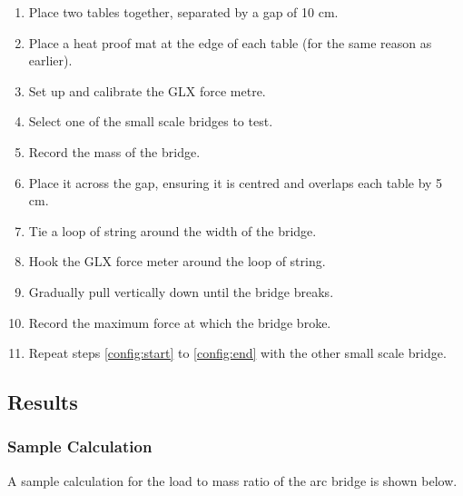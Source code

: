 \documentclass[a4paper,11pt]{article}
\begin{document}
\begin{enumerate}
\item Place two tables together, separated by a gap of 10 cm.
\item Place a heat proof mat at the edge of each table (for the same reason as
	earlier).
\item Set up and calibrate the GLX force metre.
\item \label{config:start} Select one of the small scale bridges to test.
\item Record the mass of the bridge.
\item Place it across the gap, ensuring it is centred and overlaps each table
	by 5 cm.
\item Tie a loop of string around the width of the bridge.
\item Hook the GLX force meter around the loop of string.
\item Gradually pull vertically down until the bridge breaks.
\item \label{config:end} Record the maximum force at which the bridge broke.
\item Repeat steps \ref{config:start} to \ref{config:end} with the other small
	scale bridge.
\end{enumerate}


\subsection{Results}

\begin{center}
\end{center}


\subsubsection{Sample Calculation}

A sample calculation for the load to mass ratio of the arc bridge is shown
below.
\end{document}
